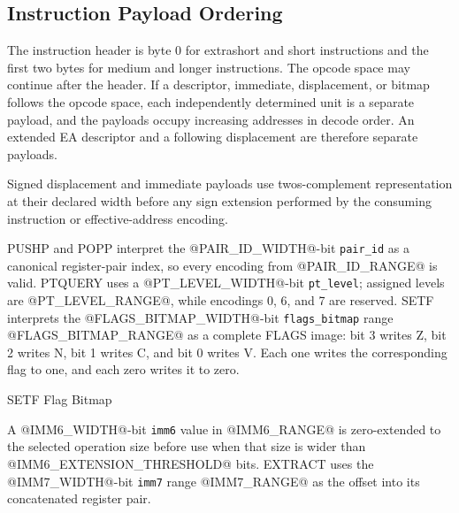 \subsection{Instruction Payload Ordering}
The instruction header is byte 0 for extrashort and short instructions and the first two bytes for medium and
longer instructions. The opcode space may continue after the header. If a descriptor, immediate, displacement, or
bitmap follows the opcode space, each independently determined unit is a separate payload, and the payloads occupy
increasing addresses in decode order. An extended EA descriptor and a following displacement are therefore separate
payloads.

Signed displacement and immediate payloads use two\textquotesingle{}s-complement representation at their declared width before any
sign extension performed by the consuming instruction or effective-address encoding.



PUSHP and POPP interpret the @PAIR_ID_WIDTH@-bit \texttt{pair\_id} as a canonical register-pair index, so every encoding
from @PAIR_ID_RANGE@ is valid.
PTQUERY uses a @PT_LEVEL_WIDTH@-bit \texttt{pt\_level}; assigned levels are @PT_LEVEL_RANGE@, while encodings 0, 6, and 7
are reserved.
SETF interprets the @FLAGS_BITMAP_WIDTH@-bit \texttt{flags\_bitmap} range @FLAGS_BITMAP_RANGE@ as a complete FLAGS
image: bit 3 writes Z, bit 2 writes N, bit 1 writes C, and bit 0 writes V. Each one writes the corresponding flag to
one, and each zero writes it to zero.

\begin{manuallistedformatdiagram}{SETF Flag Bitmap}
\end{manuallistedformatdiagram}

A @IMM6_WIDTH@-bit \texttt{imm6} value in @IMM6_RANGE@ is zero-extended to the selected operation size before use when
that size is wider than @IMM6_EXTENSION_THRESHOLD@ bits. EXTRACT uses the @IMM7_WIDTH@-bit \texttt{imm7} range @IMM7_RANGE@ as the
offset into its concatenated register pair.
